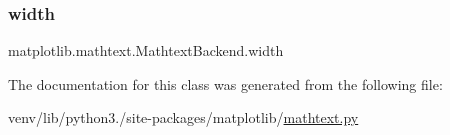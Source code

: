 \mbox{\label{classmatplotlib_1_1mathtext_1_1MathtextBackend_ad814a6749327f635a37e31146d4dfa65}} 
\subsubsection{\texorpdfstring{width}{width}}
{\footnotesize\ttfamily matplotlib.\+mathtext.\+Mathtext\+Backend.\+width}



The documentation for this class was generated from the following file\+:\begin{DoxyCompactItemize}
\item 
venv/lib/python3./site-\/packages/matplotlib/\hyperlink{mathtext_8py}{mathtext.\+py}\end{DoxyCompactItemize}
